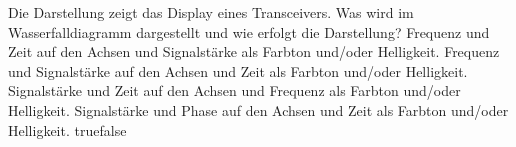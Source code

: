     {Die Darstellung zeigt das Display eines Transceivers. Was wird im Wasserfalldiagramm dargestellt und wie erfolgt die Darstellung?}
    {Frequenz und Zeit auf den Achsen und Signalstärke als Farbton und/oder Helligkeit.}
    {Frequenz und Signalstärke auf den Achsen und Zeit als Farbton und/oder Helligkeit.}
    {Signalstärke und Zeit auf den Achsen und Frequenz als Farbton und/oder Helligkeit.}
    {Signalstärke und Phase auf den Achsen und Zeit als Farbton und/oder Helligkeit.}
    {true}{false}